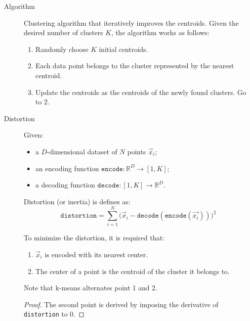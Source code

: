 \begin{description}
    \item[Algorithm] 
        Clustering algorithm that iteratively improves the centroids.
        Given the desired number of clusters $K$, the algorithm works as follows:
        \begin{enumerate}
            \item Randomly choose $K$ initial centroids.
            \item Each data point belongs to the cluster represented by the nearest centroid.
            \item Update the centroids as the centroids of the newly found clusters. Go to 2.
        \end{enumerate}

    \item[Distortion] \label{desc:distortion} 
        Given:
        \begin{itemize}
            \item a $D$-dimensional dataset of $N$ points $\vec{x}_i$;
            \item an encoding function $\texttt{encode}: \mathbb{R}^D \rightarrow [1, K]$;
            \item a decoding function $\texttt{decode}: [1, K] \rightarrow \mathbb{R}^D$.
        \end{itemize}
        Distortion (or inertia) is defines as:
        \[ \texttt{distortion} = \sum_{i=1}^{N} \big(\vec{x}_i - \texttt{decode}(\texttt{encode}(\vec{x_i})) \big)^2 \]

        \begin{theorem}
            To minimize the distortion, it is required that:
            \begin{enumerate}
                \item $\vec{x}_i$ is encoded with its nearest center.
                \item The center of a point is the centroid of the cluster it belongs to.
            \end{enumerate}

            Note that k-means alternates point 1 and 2.

            \begin{proof}
                The second point is derived by imposing the derivative of \texttt{distortion} to 0.
            \end{proof}
        \end{theorem}


\end{description}
